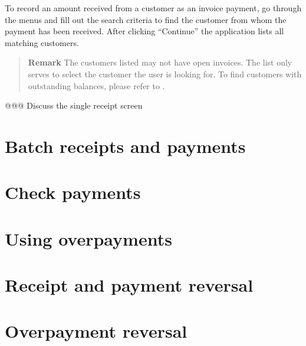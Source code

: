To record an amount received from a customer as an invoice payment, go through the menus
 and fill out the search criteria to find the customer from whom
the payment has been received. After clicking ``Continue'' the application lists all matching
customers.

\begin{quotation}
\textbf{Remark} The customers listed may not have open invoices. The list only serves to select
the customer the user is looking for. To find customers with outstanding balances, please refer to
.
\end{quotation}

@@@ Discuss the single receipt screen



\section{Batch receipts and payments}


\section{Check payments}


\section{Using overpayments}
\label{sec:UsingOverpayments}

\section{Receipt and payment reversal}


\section{Overpayment reversal}

